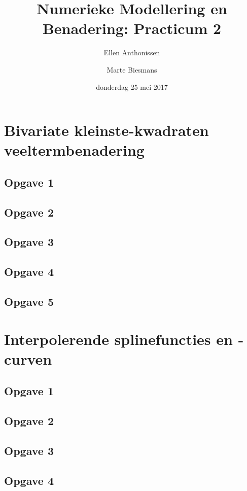 \documentclass[a4paper]{article}
\title{Numerieke Modellering en Benadering: Practicum 2}
\author{Ellen Anthonissen \and Marte Biesmans}
\date{donderdag 25 mei 2017}
\newcommand{\opgave}[1]{\subsection*{Opgave #1}}
\begin{document}
\maketitle

\section{Bivariate kleinste-kwadraten veeltermbenadering}

\opgave{1}


\opgave{2}


\opgave{3}


\opgave{4}


\opgave{5}


\section{Interpolerende splinefuncties en -curven}

\opgave{1}


\opgave{2}


\opgave{3}


\opgave{4}

\end{document}
